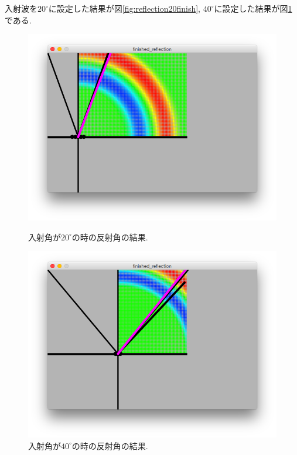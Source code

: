 入射波を$20^{\circ}$に設定した結果が図\ref{fig:reflection20finish}, $40^{\circ}$に設定した結果が図\ref{fig:reflection40finish}である.
\begin{figure}[H]
\begin{minipage}{0.5\hsize}
\begin{center}
\includegraphics[width=\linewidth]
  {../result/finishreflectionangle20.png}
\caption{入射角が$20^{\circ}$の時の反射角の結果.}
\label{fig:reflection20finish}
\end{center}
\end{minipage}%
\begin{minipage}{0.5\linewidth}
\begin{center}
\includegraphics[width=\linewidth]
  {../result/finishreflectionangle40.png}
\caption{入射角が$40^{\circ}$の時の反射角の結果.}
\label{fig:reflection40finish}
\end{center}
\end{minipage}
\end{figure}

